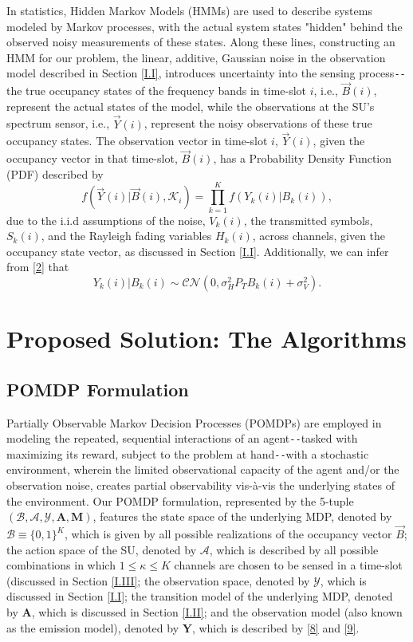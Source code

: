 \documentclass[12pt, draftcls, onecolumn]{IEEEtran}
\begin{document}
In statistics, Hidden Markov Models (HMMs) are used to describe systems modeled by Markov processes, with the actual system states "hidden" behind the observed noisy measurements of these states. Along these lines, constructing an HMM for our problem, the linear, additive, Gaussian noise in the observation model described in Section \ref{I.I}, introduces uncertainty into the sensing process\texttt{-{}-}the true occupancy states of the frequency bands in time-slot $i$, i.e., $\vec{B}(i)$, represent the actual states of the model, while the observations at the SU's spectrum sensor, i.e., $\vec{Y}(i)$, represent the noisy observations of these true occupancy states. The observation vector in time-slot $i$, $\vec{Y}(i)$, given the occupancy vector in that time-slot, $\vec{B}(i)$, has a Probability Density Function (PDF) described by
\begin{equation}\label{8}
    f(\vec{Y}(i)|\vec{B}(i),\mathcal{K}_{i})=\prod_{k=1}^{K}f(Y_{k}(i)|B_{k}(i)),
\end{equation}
due to the i.i.d assumptions of the noise, $V_{k}(i)$, the transmitted symbols, $S_{k}(i)$, and the Rayleigh fading variables $H_{k}(i)$, across channels, given the occupancy state vector, as discussed in Section \ref{I.I}. Additionally, we can infer from \eqref{2} that
\begin{equation}\label{9}
    Y_{k}(i)|B_{k}(i)\sim\mathcal{CN}(0,\sigma_{H}^{2}P_{T}B_{k}(i)+\sigma_{V}^{2}).
\end{equation}

\section{Proposed Solution: The Algorithms}\label{II}

\subsection{POMDP Formulation}\label{II.0}
Partially Observable Markov Decision Processes (POMDPs) are employed in modeling the repeated, sequential interactions of an agent\texttt{-{}-}tasked with maximizing its reward, subject to the problem at hand\texttt{-{}-}with a stochastic environment, wherein the limited observational capacity of the agent and/or the observation noise, creates partial observability vis-\`{a}-vis the underlying states of the environment. Our POMDP formulation, represented by the 5-tuple $(\mathcal{B},\mathcal{A},\mathcal{Y},\mathbf{A},\mathbf{M})$, features the state space of the underlying MDP, denoted by $\mathcal{B}{\equiv}\{0,1\}^{K}$, which is given by all possible realizations of the occupancy vector $\vec{B}$; the action space of the SU, denoted by $\mathcal{A}$, which is described by all possible combinations in which $1{\leq}\kappa{\leq}K$ channels are chosen to be sensed in a time-slot (discussed in Section \ref{I.III}; the observation space, denoted by $\mathcal{Y}$, which is discussed in Section \ref{I.I}; the transition model of the underlying MDP, denoted by $\mathbf{A}$, which is discussed in Section \ref{I.II}; and the observation model (also known as the emission model), denoted by $\mathbf{Y}$, which is described by \eqref{8} and \eqref{9}.
\end{document}
